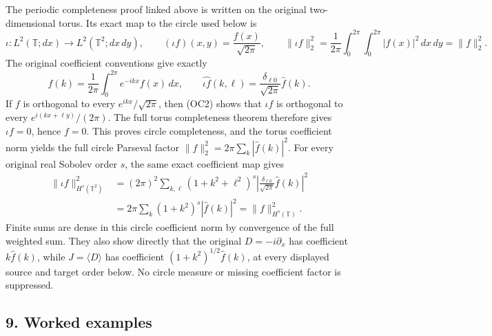 \documentclass[
  11pt,
]{article}
\makeatletter
\let\ReaderOriginalAnchorStart\hyper@anchorstart
\let\ReaderOriginalAnchorEnd\hyper@anchorend
\let\ReaderPendingAliases\@empty
\def\ReaderArmAliases#1{\gdef\ReaderPendingAliases{#1}}
\def\hyper@anchorstart#1{\ReaderIfNativeAnchorTF{#1}{\ReaderPendingAliases\global\let\ReaderPendingAliases\@empty}{}\ReaderOriginalAnchorStart{#1}}
\makeatother
\begin{document}
The periodic completeness proof linked above is written on the original
two-dimensional torus. Its exact map to the circle used below is \[
 \iota:L^2(\mathbb T;dx)\longrightarrow
 L^2(\mathbb T^2;dx\,dy),\qquad
 (\iota f)(x,y)=\frac{f(x)}{\sqrt{2\pi}},\qquad
 \|\iota f\|_2^2=\frac1{2\pi}
                  \int_0^{2\pi}\int_0^{2\pi}|f(x)|^2\,dx\,dy
                =\|f\|_2^2.
 \tag{OC1}
\] The original coefficient conventions give exactly \[
 \widehat f(k)=\frac1{2\pi}\int_0^{2\pi}e^{-ikx}f(x)\,dx,
 \qquad
 \widehat{\iota f}(k,\ell)
     =\frac{\delta_{\ell0}}{\sqrt{2\pi}}\widehat f(k).
 \tag{OC2}
\] If \(f\) is orthogonal to every \(e^{ikx}/\sqrt{2\pi}\), then (OC2)
shows that \(\iota f\) is orthogonal to every
\(e^{i(kx+\ell y)}/(2\pi)\). The full torus completeness theorem
therefore gives \(\iota f=0\), hence \(f=0\). This proves circle
completeness, and the torus coefficient norm yields the full circle
Parseval factor \(\|f\|_2^2=2\pi\sum_k|\widehat f(k)|^2\). For every
original real Sobolev order \(s\), the same exact coefficient map gives
\[
 \begin{aligned}
 \|\iota f\|_{H^s(\mathbb T^2)}^2
 &=(2\pi)^2\sum_{k,\ell}(1+k^2+\ell^2)^s
       \left|\frac{\delta_{\ell0}}{\sqrt{2\pi}}\widehat f(k)\right|^2\\
 &=2\pi\sum_k(1+k^2)^s|\widehat f(k)|^2
  =\|f\|_{H^s(\mathbb T)}^2.
 \end{aligned}
 \tag{OC3}
\] Finite sums are dense in this circle coefficient norm by convergence
of the full weighted sum. They also show directly that the original
\(D=-i\partial_x\) has coefficient \(k\widehat f(k)\), while
\(J=\langle D\rangle\) has coefficient \((1+k^2)^{1/2}\widehat f(k)\),
at every displayed source and target order below. No circle measure or
missing coefficient factor is suppressed.

\ReaderArmAliases{\ReaderOriginalAnchorStart{AN03-OMF-009}\ReaderOriginalAnchorEnd\begingroup\expandafter\def\csname @currentHref\endcsname{AN03-OMF-009}\label{AN03-OMF-009}\endgroup\ReaderOriginalAnchorStart{9-worked-examples}\ReaderOriginalAnchorEnd\begingroup\expandafter\def\csname @currentHref\endcsname{9-worked-examples}\label{9-worked-examples}\endgroup}
\subsection{9. Worked examples}\label{worked-examples}
\end{document}
